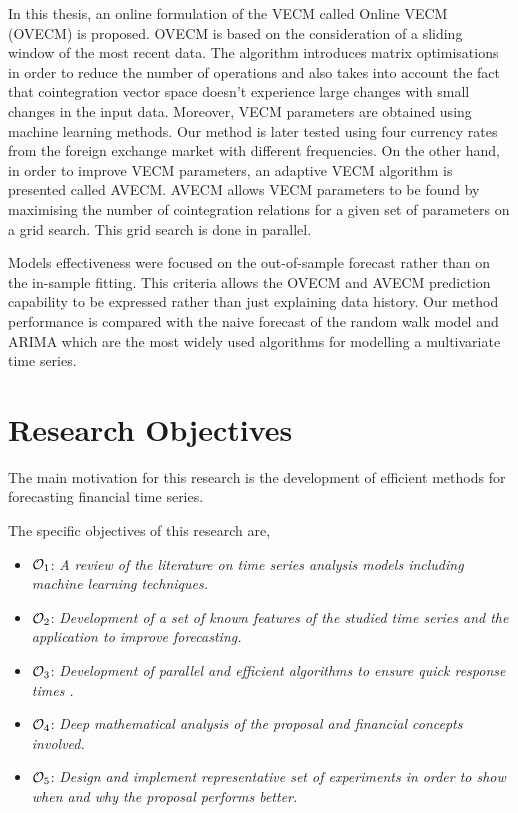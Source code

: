 In this thesis, an online formulation of the VECM called Online VECM (OVECM) is
proposed. OVECM is based on the consideration of a sliding window of the most
recent data.  The algorithm introduces matrix optimisations in order to reduce
the number of operations and also takes into account the fact that cointegration
vector space doesn't experience large changes with small changes in the input
data. Moreover, VECM parameters are obtained using machine learning methods. Our
method is later tested using four currency rates from the foreign exchange
market with different frequencies.  On the other hand, in order to improve VECM
parameters, an adaptive VECM algorithm is presented called AVECM. AVECM allows
VECM parameters to be found by maximising the number of cointegration relations
for a given set of parameters on a grid search. This grid search is done in
parallel.

Models effectiveness were focused on the out-of-sample forecast rather than on
the in-sample fitting. This criteria allows the OVECM and AVECM prediction
capability to be expressed rather than just explaining data history. Our method
performance is compared with the naive forecast of the random walk model and
ARIMA which are the most widely used algorithms for modelling a multivariate
time series.


\section{Research Objectives}
The main motivation for this research is the development of efficient methods
for forecasting financial time series.

The specific objectives of this research are,
\begin{itemize}
\item $\Large \mathcal{O}_1$: \emph{A review of the literature on time series
analysis models including machine learning techniques.}
\item $\Large \mathcal{O}_2$: \emph{Development of a set of known features of the
studied time series and the application to improve forecasting.}
\item $\Large \mathcal{O}_3$: \emph{Development of parallel and efficient
algorithms to ensure quick response times .}
\item $\Large \mathcal{O}_4$: \emph{Deep mathematical analysis of the proposal
and financial concepts involved.}
\item $\Large \mathcal{O}_5$: \emph{Design and implement representative set of
experiments in order to show when and why the proposal performs better.}
\end{itemize}


